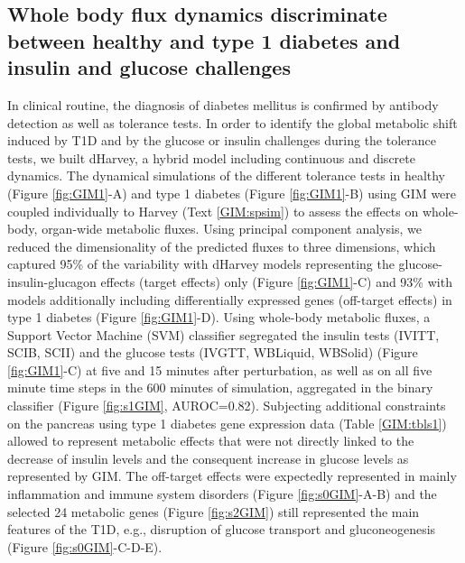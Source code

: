 \subsection{Whole body flux dynamics discriminate between healthy and type 1 diabetes and insulin and glucose challenges}
In clinical routine, the diagnosis of diabetes mellitus is confirmed by antibody detection as well as tolerance tests. In order to identify the global metabolic shift induced by T1D and by the glucose or insulin challenges during the tolerance tests, we built dHarvey, a hybrid model including continuous and discrete dynamics. The dynamical simulations of the different tolerance tests in healthy (Figure \ref{fig:GIM1}-A) and type 1 diabetes (Figure \ref{fig:GIM1}-B) using GIM were coupled individually to Harvey (Text \ref{GIM:spsim}) to assess the effects on whole-body, organ-wide metabolic fluxes. Using principal component analysis, we reduced the dimensionality of the predicted fluxes to three dimensions, which captured 95\% of the variability with dHarvey models representing the glucose-insulin-glucagon effects (target effects) only (Figure \ref{fig:GIM1}-C) and 93\% with models additionally including differentially expressed genes (off-target effects) in type 1 diabetes (Figure \ref{fig:GIM1}-D). Using whole-body metabolic fluxes, a Support Vector Machine (SVM) classifier segregated the insulin tests (IVITT, SCIB, SCII) and the glucose tests (IVGTT, WBLiquid, WBSolid) (Figure \ref{fig:GIM1}-C) at five and 15 minutes after perturbation, as well as on all five minute time steps in the 600 minutes of simulation, aggregated in the binary classifier (Figure \ref{fig:s1GIM}, AUROC=0.82). Subjecting additional constraints on the pancreas using type 1 diabetes gene expression data (Table \ref{GIM:tbls1}) allowed to represent metabolic effects that were not directly linked to the decrease of insulin levels and the consequent increase in glucose levels as represented by GIM. The off-target effects were expectedly represented in mainly inflammation and immune system disorders (Figure \ref{fig:s0GIM}-A-B) and the selected 24 metabolic genes (Figure \ref{fig:s2GIM}) still represented the main features of the T1D, e.g., disruption of glucose transport and gluconeogenesis (Figure \ref{fig:s0GIM}-C-D-E).\\ 
